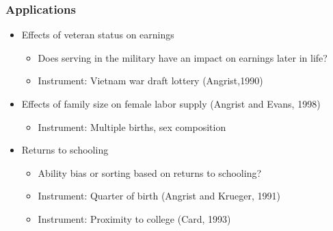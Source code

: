 \documentclass[pdftex]{beamer}
\begin{document}
\begin{frame}
\frametitle{Applications}

\begin{itemize}
\item Effects of veteran status on earnings
	\begin{itemize}
		\item Does serving in the military have an impact on earnings later in life?
		\item Instrument: Vietnam war draft lottery  (Angrist,1990)
	\end{itemize}
\item Effects of family size on female labor supply (Angrist and Evans, 1998)
	\begin{itemize}
		\item Instrument: Multiple births, sex composition
	\end{itemize}
\item Returns to schooling
	\begin{itemize}
		\item Ability bias or sorting based on returns to schooling?
		\item Instrument: Quarter of birth (Angrist and Krueger, 1991)
		\item Instrument: Proximity to college (Card, 1993)
	\end{itemize}

\end{itemize}

\end{frame}
\end{document}
